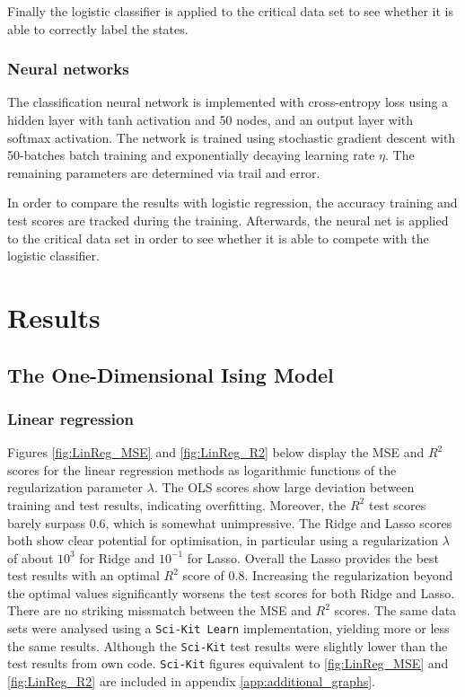 \documentclass[nofootinbib,reprint,english]{revtex4-1}
\begin{document}
Finally the logistic classifier is applied to the critical data set to see whether it is able to correctly label the states.
\subsubsection{Neural networks}
The classification neural network is implemented with cross-entropy loss using a hidden layer with tanh activation and 50 nodes, and an output layer with softmax activation. The network is trained using stochastic gradient descent with 50-batches batch training and exponentially decaying learning rate \(\eta\). The remaining parameters are determined via trail and error.

In order to compare the results with logistic regression, the accuracy training and test scores are tracked during the training. Afterwards, the neural net is applied to the critical data set in order to see whether it is able to compete with the logistic classifier.




\newpage

\section{Results}
\subsection{The One-Dimensional Ising Model}
\subsubsection{Linear regression}
Figures \ref{fig:LinReg_MSE} and \ref{fig:LinReg_R2} below display the MSE and \(R^2\) scores for the linear regression methods as logarithmic functions of the regularization parameter \(\lambda\). The OLS scores show large deviation between training and test results, indicating overfitting. Moreover, the \(R^2\) test scores barely surpass 0.6, which is somewhat unimpressive. The Ridge and Lasso scores both show clear potential for optimisation, in particular using a regularization \(\lambda\) of about \(10^3\) for Ridge and \(10^{-1}\) for Lasso. Overall the Lasso provides the best test results with an optimal \(R^2\) score of 0.8. Increasing the regularization beyond the optimal values significantly worsens the test scores for both Ridge and Lasso. There are no striking missmatch between the MSE and \(R^2\) scores. The same data sets were analysed using a \texttt{Sci-Kit Learn} implementation, yielding more or less the same results. Although the \texttt{Sci-Kit} test results were slightly lower than the test results from own code. \texttt{Sci-Kit} figures equivalent to \ref{fig:LinReg_MSE} and \ref{fig:LinReg_R2} are included in appendix \ref{app:additional_graphs}.
\end{document}

